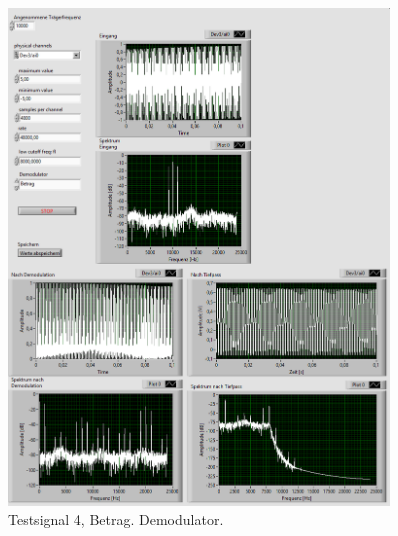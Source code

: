 \begin{figure}[H]
	\centering
	\includegraphics[width=0.9\textwidth]{pic/dam_4_betrag.png}
	\caption{Testsignal 4, Betrag. Demodulator.}
	\label{fig:a5}	
\end{figure}

\newpage

